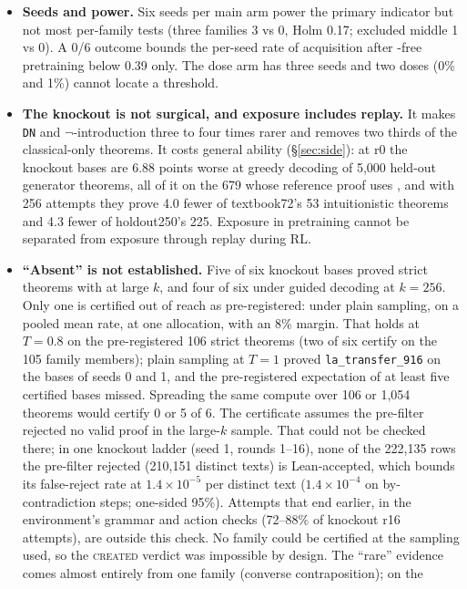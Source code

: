 \begin{itemize}
dynamics, is also a post hoc measure: it was defined after round 3 of the experiment and was not pre-registered.
\item \textbf{Seeds and power.} Six seeds per main arm power the primary indicator but not most per-family tests (three
families 3 vs 0, Holm 0.17; excluded middle 1 vs 0). A 0/6 outcome bounds the per-seed rate of acquisition after
\sig-free pretraining below 0.39 only. The dose arm has three seeds and two doses (0\% and 1\%) cannot locate a threshold.
\item \textbf{The knockout is not surgical, and exposure includes replay.} It makes \texttt{DN} and $\neg$-introduction
three to four times rarer and removes two thirds of the classical-only theorems. It costs general ability
(\S\ref{sec:side}): at r0 the knockout bases are 6.88 points worse at greedy decoding of 5,000 held-out generator
theorems, all of it on the 679 whose reference proof uses \sig{}, and with 256 attempts they prove 4.0 fewer of
textbook72's 53 intuitionistic theorems and 4.3 fewer of holdout250's 225. Exposure in pretraining cannot be separated from exposure through replay during RL.
\item \textbf{``Absent'' is not established.} Five of six knockout bases proved strict theorems with \sig{} at large
$k$, and four of six under guided decoding at $k = 256$. Only one is certified out of reach as pre-registered: under plain
sampling, on a pooled mean rate, at one allocation, with an 8\% margin. That holds at $T = 0.8$ on the
pre-registered 106 strict theorems (two of six certify on the 105 family members); plain sampling at $T = 1$ proved
\texttt{la\_transfer\_916} on the bases of seeds 0 and 1, and the pre-registered expectation of at least five certified
bases missed. Spreading the same compute over 106 or 1,054
theorems would certify 0 or 5 of 6. The certificate assumes the pre-filter rejected no valid proof in the large-$k$
sample. That could not be checked there; in one knockout ladder (seed 1, rounds 1--16), none of the 222,135 rows
the pre-filter rejected (210,151 distinct texts) is Lean-accepted, which bounds its false-reject rate at
$1.4\times10^{-5}$ per distinct text ($1.4\times10^{-4}$ on by-contradiction steps; one-sided 95\%). Attempts that end
earlier, in the environment's grammar and action checks (72--88\% of knockout r16 attempts), are outside this check. No family could be certified at the sampling used, so the \textsc{created} verdict
was impossible by design. The ``rare'' evidence comes almost entirely from one family (converse contraposition); on the

\end{itemize}
